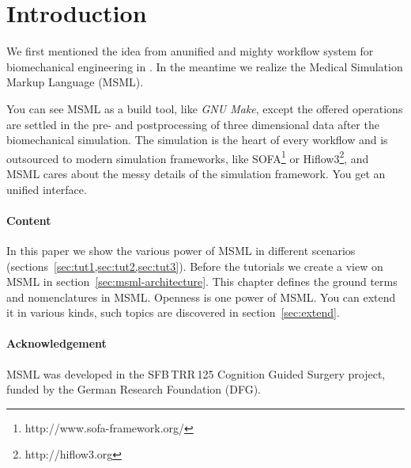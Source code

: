 \section{Introduction}
\label{sec:introduction}

We first mentioned the idea from anunified and mighty workflow system for biomechanical engineering  in
\cite{Suwelack:2014}. In the meantime we realize the Medical
Simulation Markup Language (MSML).

You can see MSML as a build tool, like \emph{GNU Make}, except the
offered operations are settled in the pre- and postprocessing of
three dimensional data after the biomechanical simulation.
The simulation is the heart of every workflow and is outsourced to
modern simulation frameworks, like
SOFA\footnote{http://www.sofa-framework.org/} or
Hiflow3\footnote{http://hiflow3.org}, and MSML cares about the messy
details of the simulation framework. You get an unified interface.

\paragraph{Content}
\label{sec:content}

In this paper we show the various power of MSML in different
scenarios (sections~\ref{sec:tut1,sec:tut2,sec:tut3}).
Before the tutorials we create a view on MSML in
section~\ref{sec:msml-architecture}. This chapter defines the ground
terms and nomenclatures in MSML. Openness is one power of MSML. You
can extend it in various kinds, such topics are discovered in
section~\ref{sec:extend}.

\paragraph*{Acknowledgement}
\label{sec:acknowledgement}

MSML was developed in the SFB\,TRR\,125 Cognition Guided Surgery
project, funded by the German Research Foundation (DFG).


